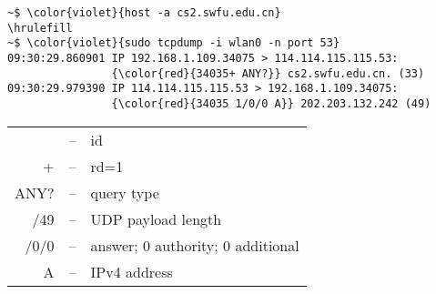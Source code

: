 \documentclass[varwidth=31.5em,crop]{standalone}
\begin{document}
\begin{Verbatim}[commandchars=\\\{\}]
~$ \color{violet}{host -a cs2.swfu.edu.cn}
\hrulefill
~$ \color{violet}{sudo tcpdump -i wlan0 -n port 53}
09:30:29.860901 IP 192.168.1.109.34075 > 114.114.115.115.53:
                {\color{red}{34035+ ANY?}} cs2.swfu.edu.cn. (33)
09:30:29.979390 IP 114.114.115.115.53 > 192.168.1.109.34075:
                {\color{red}{34035 1/0/0 A}} 202.203.132.242 (49)
\end{Verbatim}
\vspace{-1.5em}
\hrulefill
\begin{center}
  \begin{tabular}{>{\ttfamily}rc>{\sffamily}l}
    34035&--&id\\
    +&--&rd=1\\
    ANY?&--& query type\\
    33/49&--&UDP payload length\\
    1/0/0&--&1 answer; 0 authority; 0 additional\\
    A&--&IPv4 address
  \end{tabular}
\end{center}
\end{document}
